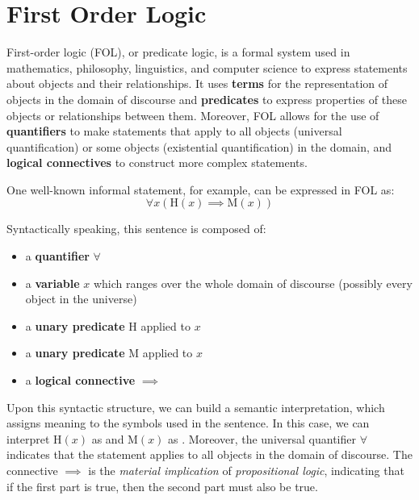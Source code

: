 \chapter{First Order Logic}\label{chap:first}

\inlineminitoc{}

\noindent First-order logic (FOL), or predicate logic, is a formal system used in mathematics, philosophy, linguistics, and computer science to express statements about objects and their relationships.
It uses \textbf{terms} for the representation of objects in the domain of discourse and \textbf{predicates} to express properties of these objects or relationships between them.
Moreover, FOL allows for the use of \textbf{quantifiers} to make statements that apply to all objects (universal quantification) or some objects (existential quantification) in the domain, and \textbf{logical connectives} to construct more complex statements.

One well-known informal statement,  for example, can be expressed in FOL as:
\begin{equation*}
    \forall x \left( \text{H}(x) \implies \text{M}(x) \right)
\end{equation*}

Syntactically speaking, this sentence is composed of:
\begin{itemize}
    \item a \textbf{quantifier} \(\forall\)
    \item a \textbf{variable} \(x\) which ranges over the whole domain of discourse (possibly every object in the universe)
    \item a \textbf{unary predicate} \(\text{H}\) applied to \(x\)
    \item a \textbf{unary predicate} \(\text{M}\) applied to \(x\)
    \item a \textbf{logical connective} \(\implies\)
\end{itemize}

Upon this syntactic structure, we can build a semantic interpretation, which assigns meaning to the symbols used in the sentence.
In this case, we can interpret \(\text{H}(x)\) as  and \(\text{M}(x)\) as .
Moreover, the universal quantifier \(\forall\) indicates that the statement applies to all objects in the domain of discourse.
The connective \(\implies\) is the \textit{material implication} of \textit{propositional logic}, indicating that if the first part is true, then the second part must also be true.

